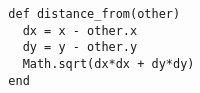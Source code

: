 \begin{verbatim}
  def distance_from(other)
    dx = x - other.x
    dy = y - other.y
    Math.sqrt(dx*dx + dy*dy)
  end
\end{verbatim}
